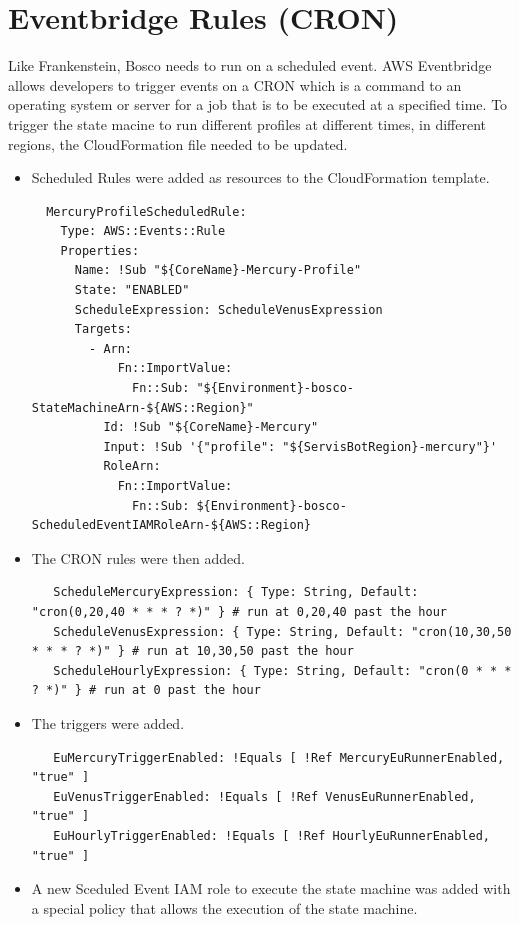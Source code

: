 \documentclass[12pt,a4paper,titlepage]{report}
\begin{document}
\section{Eventbridge Rules (CRON) }

Like Frankenstein, Bosco needs to run on a scheduled event. AWS Eventbridge allows developers to trigger events on a CRON which is a command to an operating system or server for a job that is to be executed at a specified time. 
To trigger the state macine to run different profiles at different times, in different regions, the  CloudFormation file needed to be updated. 
\begin{itemize}
 \item Scheduled Rules were added as resources to the CloudFormation template.
 \begin{tcolorbox}
  \begin{verbatim}
  MercuryProfileScheduledRule:
    Type: AWS::Events::Rule
    Properties:
      Name: !Sub "${CoreName}-Mercury-Profile"
      State: "ENABLED"
      ScheduleExpression: ScheduleVenusExpression
      Targets:
        - Arn: 
            Fn::ImportValue: 
              Fn::Sub: "${Environment}-bosco-StateMachineArn-${AWS::Region}"
          Id: !Sub "${CoreName}-Mercury"
          Input: !Sub '{"profile": "${ServisBotRegion}-mercury"}'
          RoleArn: 
            Fn::ImportValue:
              Fn::Sub: ${Environment}-bosco-ScheduledEventIAMRoleArn-${AWS::Region}
  \end{verbatim}
 \end{tcolorbox}
 \item The CRON rules were then added.
  \begin{tcolorbox}
   \begin{verbatim}
   ScheduleMercuryExpression: { Type: String, Default: "cron(0,20,40 * * * ? *)" } # run at 0,20,40 past the hour
   ScheduleVenusExpression: { Type: String, Default: "cron(10,30,50 * * * ? *)" } # run at 10,30,50 past the hour
   ScheduleHourlyExpression: { Type: String, Default: "cron(0 * * * ? *)" } # run at 0 past the hour
   \end{verbatim}
  \end{tcolorbox}

 \item The triggers were added.
 \begin{tcolorbox}
  \begin{verbatim}
   EuMercuryTriggerEnabled: !Equals [ !Ref MercuryEuRunnerEnabled, "true" ]
   EuVenusTriggerEnabled: !Equals [ !Ref VenusEuRunnerEnabled, "true" ]
   EuHourlyTriggerEnabled: !Equals [ !Ref HourlyEuRunnerEnabled, "true" ]
  \end{verbatim}
 \end{tcolorbox}
 \item A new Sceduled Event IAM role to execute the state machine was added with a special policy that allows the execution of the state machine. 
 

\end{itemize}
\end{document}
